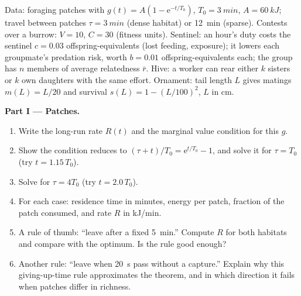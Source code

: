 \begin{problem}
\label{pb:b3:behavioural-ecology:1}
Data: foraging patches with $g(t) = A(1 - \mathrm{e}^{-t/T_{0}})$, $T_{0}
= \qty{3}{min}$, $A = \qty{60}{kJ}$; travel between patches $\tau =
\qty{3}{min}$ (dense habitat) or \qty{12}{min} (sparse). Contests over
a burrow: $V = 10$, $C = 30$ (fitness units). Sentinel: an hour's duty
costs the sentinel $c = 0.03$ offspring-equivalents (lost feeding,
exposure); it lowers each groupmate's predation risk, worth $b = 0.01$
offspring-equivalents each; the group has $n$ members of average
relatedness $\bar r$. Hive: a worker can rear either $k$ sisters or $k$
own daughters with the same effort. Ornament: tail length $L$ gives
matings $m(L) = L/20$ and survival $s(L) = 1 - (L/100)^{2}$, $L$ in cm.

\medskip
\noindent\textbf{Part I --- Patches.}
\begin{enumerate}
  \item Write the long-run rate $R(t)$ and the marginal value condition
        for this $g$.
  \item Show the condition reduces to $(\tau + t)/T_{0} = \mathrm{e}^{t/T_{0}}
        - 1$, and solve it for $\tau = T_{0}$ (try $t = 1.15\,T_{0}$).
  \item Solve for $\tau = 4T_{0}$ (try $t = 2.0\,T_{0}$).
  \item For each case: residence time in minutes, energy per patch,
        fraction of the patch consumed, and rate $R$ in kJ/min.
  \item A rule of thumb: ``leave after a fixed \qty{5}{min}.'' Compute
        $R$ for both habitats and compare with the optimum. Is the rule
        good enough?
  \item Another rule: ``leave when \qty{20}{s} pass without a
        capture.'' Explain why this giving-up-time rule approximates the
        theorem, and in which direction it fails when patches differ in
        richness.
\end{enumerate}


\end{problem}
